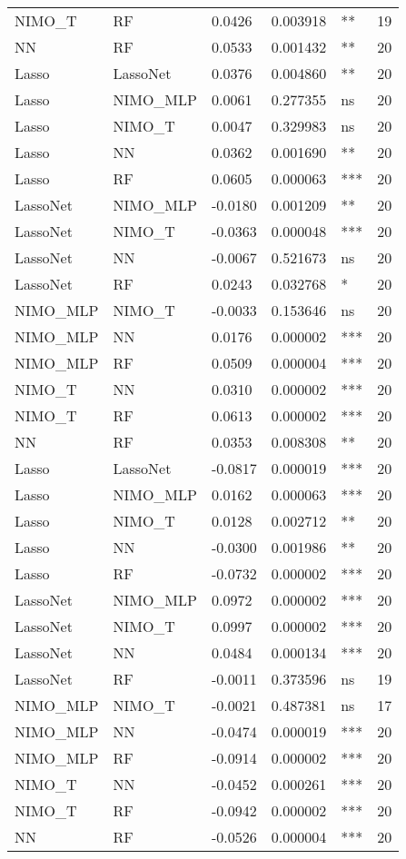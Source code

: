 \begin{tabular}{lllllr}
NIMO_T & RF & 0.0426 & 0.003918 & ** & 19 \\
NN & RF & 0.0533 & 0.001432 & ** & 20 \\
Lasso & LassoNet & 0.0376 & 0.004860 & ** & 20 \\
Lasso & NIMO_MLP & 0.0061 & 0.277355 & ns & 20 \\
Lasso & NIMO_T & 0.0047 & 0.329983 & ns & 20 \\
Lasso & NN & 0.0362 & 0.001690 & ** & 20 \\
Lasso & RF & 0.0605 & 0.000063 & *** & 20 \\
LassoNet & NIMO_MLP & -0.0180 & 0.001209 & ** & 20 \\
LassoNet & NIMO_T & -0.0363 & 0.000048 & *** & 20 \\
LassoNet & NN & -0.0067 & 0.521673 & ns & 20 \\
LassoNet & RF & 0.0243 & 0.032768 & * & 20 \\
NIMO_MLP & NIMO_T & -0.0033 & 0.153646 & ns & 20 \\
NIMO_MLP & NN & 0.0176 & 0.000002 & *** & 20 \\
NIMO_MLP & RF & 0.0509 & 0.000004 & *** & 20 \\
NIMO_T & NN & 0.0310 & 0.000002 & *** & 20 \\
NIMO_T & RF & 0.0613 & 0.000002 & *** & 20 \\
NN & RF & 0.0353 & 0.008308 & ** & 20 \\
Lasso & LassoNet & -0.0817 & 0.000019 & *** & 20 \\
Lasso & NIMO_MLP & 0.0162 & 0.000063 & *** & 20 \\
Lasso & NIMO_T & 0.0128 & 0.002712 & ** & 20 \\
Lasso & NN & -0.0300 & 0.001986 & ** & 20 \\
Lasso & RF & -0.0732 & 0.000002 & *** & 20 \\
LassoNet & NIMO_MLP & 0.0972 & 0.000002 & *** & 20 \\
LassoNet & NIMO_T & 0.0997 & 0.000002 & *** & 20 \\
LassoNet & NN & 0.0484 & 0.000134 & *** & 20 \\
LassoNet & RF & -0.0011 & 0.373596 & ns & 19 \\
NIMO_MLP & NIMO_T & -0.0021 & 0.487381 & ns & 17 \\
NIMO_MLP & NN & -0.0474 & 0.000019 & *** & 20 \\
NIMO_MLP & RF & -0.0914 & 0.000002 & *** & 20 \\
NIMO_T & NN & -0.0452 & 0.000261 & *** & 20 \\
NIMO_T & RF & -0.0942 & 0.000002 & *** & 20 \\
NN & RF & -0.0526 & 0.000004 & *** & 20 \\
\bottomrule
\end{tabular}
